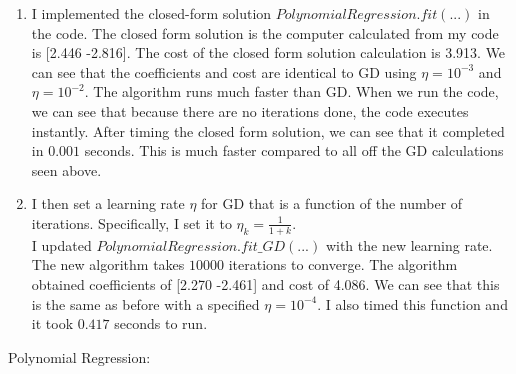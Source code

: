 \documentclass[11pt]{article}
\begin{document}
\begin{enumerate}[resume]
\item I implemented the closed-form solution $PolynomialRegression.fit(...)$ in the code. The closed form solution is the computer calculated from my code is [2.446 -2.816]. The cost of the closed form solution calculation is 3.913. We can see that the coefficients and cost are identical to GD using $\eta = 10^{-3}$ and $\eta = 10^{-2}$. The algorithm runs much faster than GD. When we run the code, we can see that because there are no iterations done, the code executes instantly. After timing the closed form solution, we can see that it completed in $0.001$ seconds. This is much faster compared to all off the GD calculations seen above.

\item I then set a learning rate $\eta$ for GD that is a function of the number of iterations. Specifically, I set it to $\eta_{k} = \frac{1}{1+k}$. \\I updated $PolynomialRegression.fit\_GD(...)$ with the new learning rate. The new algorithm takes $10000$ iterations to converge. The algorithm obtained coefficients of [2.270 -2.461] and cost of 4.086. We can see that this is the same as before with a specified $\eta = 10^{-4}$. I also timed this function and it took $0.417$ seconds to run. 
\end{enumerate} 
Polynomial Regression:
\end{document}
